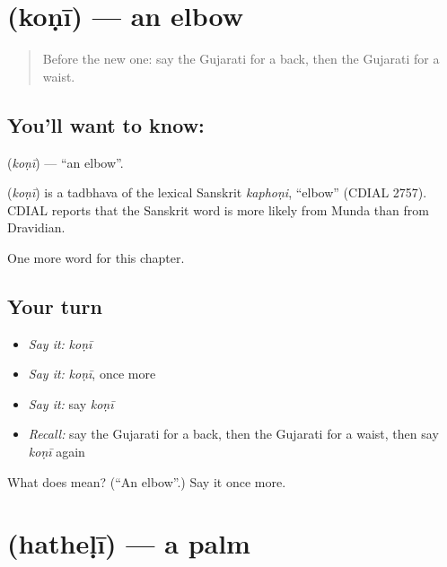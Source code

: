 \section[\texorpdfstring{\gu{કોણી} (koṇī)}{કોણી (koṇī)}]{ (koṇī) — an elbow}

\label{lesson:GU-C126-koni}



\begin{quote}
Before the new one: say the Gujarati for a back, then the Gujarati for a waist.
\end{quote}

\subsection*{You'll want to know: }
\textbf{} (\emph{koṇī}) — \textquotedblleft{}an elbow\textquotedblright{}.

\begin{cousinweb}
\textbf{} (\emph{koṇī}) is a tadbhava of the lexical Sanskrit \emph{kaphoṇi}, \textquotedblleft{}elbow\textquotedblright{} (CDIAL 2757). CDIAL reports that the Sanskrit word is more likely from Munda than from Dravidian.
\end{cousinweb}

\begin{grammarlens}[title={What you've built}]
One more word for this chapter.
\end{grammarlens}

\subsection*{Your turn}
\begin{itemize}
\raggedright
  \item \emph{Say it:} \emph{koṇī}
  \item \emph{Say it:} \emph{koṇī}, once more
  \item \emph{Say it:} say \emph{koṇī}
  \item \emph{Recall:} say the Gujarati for a back, then the Gujarati for a waist, then say \emph{koṇī} again
\end{itemize}

\begin{tcolorbox}[breakable,colback=teal!4,colframe=teal!35!black,title={Before you move on}]
What does  mean? (\textquotedblleft{}An elbow\textquotedblright{}.) Say it once more.
\end{tcolorbox}
\section[\texorpdfstring{\gu{હથેળી} (hatheḷī)}{હથેળી (hatheḷī)}]{ (hatheḷī) — a palm}

